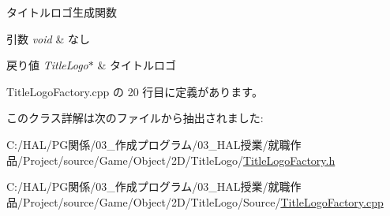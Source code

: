 タイトルロゴ生成関数 


\begin{DoxyParams}{引数}
{\em void} & なし \\
\hline
\end{DoxyParams}

\begin{DoxyRetVals}{戻り値}
{\em Title\+Logo$\ast$} & タイトルロゴ \\
\hline
\end{DoxyRetVals}


 Title\+Logo\+Factory.\+cpp の 20 行目に定義があります。



このクラス詳解は次のファイルから抽出されました\+:\begin{DoxyCompactItemize}
\item 
C\+:/\+H\+A\+L/\+P\+G関係/03\+\_\+作成プログラム/03\+\_\+\+H\+A\+L授業/就職作品/\+Project/source/\+Game/\+Object/2\+D/\+Title\+Logo/\mbox{\hyperlink{_title_logo_factory_8h}{Title\+Logo\+Factory.\+h}}\item 
C\+:/\+H\+A\+L/\+P\+G関係/03\+\_\+作成プログラム/03\+\_\+\+H\+A\+L授業/就職作品/\+Project/source/\+Game/\+Object/2\+D/\+Title\+Logo/\+Source/\mbox{\hyperlink{_title_logo_factory_8cpp}{Title\+Logo\+Factory.\+cpp}}\end{DoxyCompactItemize}
